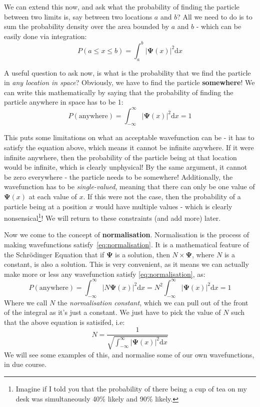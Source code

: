 \documentclass{memoir}[11pt,oneside,a4paper,openany]
\newcommand{\wf}{\ensuremath{\bm{\Psi}}\xspace}
\begin{document}
We can extend this now, and ask what the probability of finding the particle between two limits is, say between two locations $a$ and $b$? All we need to do is to sum the probability density over the area bounded by $a$ and $b$ - which can be easily done via integration:
\begin{equation}
	P(a\leq x \leq b) = \int_a^b \lvert \wf(x) \rvert ^2 \mathrm{d}x
\end{equation}

A useful question to ask now, is what is the probability that we find the particle in \emph{any location in space}? Obviously, we have to find the particle \textbf{somewhere}! We can write this mathematically by saying that the probability of finding the particle anywhere in space has to be 1:
\begin{equation}\label{eq:normalisation}
	P(\text{anywhere}) = \int_{-\infty}^{\infty} \lvert \wf(x) \rvert ^2 \mathrm{d}x = 1
\end{equation}

This puts some limitations on what an acceptable wavefunction can be - it has to satisfy the equation above, which means it cannot be infinite anywhere. If it were infinite anywhere, then the probability of the particle being at that location would be infinite, which is clearly unphysical! By the same argument, it cannot be zero everywhere - the particle needs to be somewhere! Additionally, the wavefunction has to be \emph{single-valued}, meaning that there can only be one value of $\wf(x)$ at each value of $x$. If this were not the case, then the probability of a particle being at a position $x$ would have multiple values - which is clearly nonsensical\footnote{Imagine if I told you that the probability of there being a cup of tea on my desk was simultaneously 40\% likely and 90\% likely.}! We will return to these constraints (and add more) later.

Now we come to the concept of \textbf{normalisation}. Normalisation is the process of making wavefunctions satisfy~\autoref{eq:normalisation}. It is a mathematical feature of the Schr{\"o}dinger Equation that if \wf is a solution, then $N \times \wf$, where $N$ is a constant, is also a solution. This is very convenient, as it means we can actually make more or less any wavefunction satisfy \autoref{eq:normalisation}, as:
\begin{equation}
	P(\text{anywhere}) = \int_{-\infty}^{\infty} \lvert N\wf(x) \rvert ^2 \mathrm{d}x = N^2 \int_{-\infty}^{\infty} \lvert \wf(x) \rvert ^2 \mathrm{d}x = 1
\end{equation}
Where we call $N$ the \emph{normalisation constant}, which we can pull out of the front of the integral as it's just a constant. We just have to pick the value of $N$ such that the above equation is satisifed, i.e:
\begin{equation}
	N = \frac{1}{\sqrt{\int_{-\infty}^{\infty} \lvert \wf(x) \rvert ^2 \mathrm{d}x}}
\end{equation}
We will see some examples of this, and normalise some of our own wavefunctions, in due course.
\end{document}
